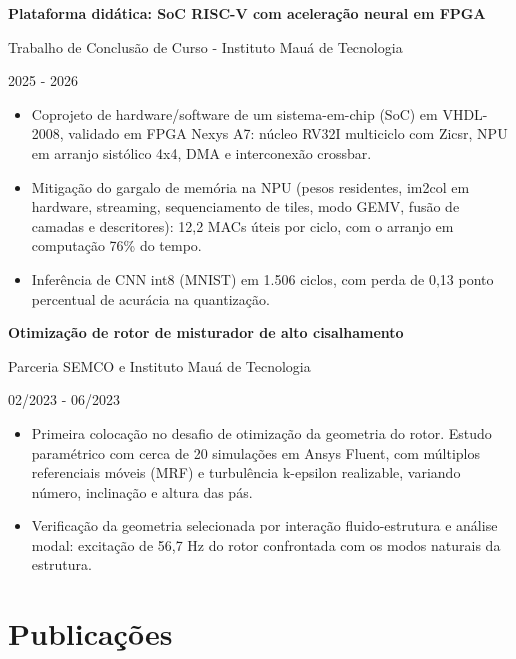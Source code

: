 \documentclass[10pt,a4paper]{article}
\newcommand{\entrada}[3]{%
  \textbf{#1}\par
  #2\par
  #3\par
  \vspace{2pt}}
\newcommand{\espaco}{\vspace{7pt}}
\begin{document}
\espaco
\entrada{Plataforma didática: SoC RISC-V com aceleração neural em FPGA}
        {Trabalho de Conclusão de Curso - Instituto Mauá de Tecnologia}
        {2025 - 2026}
\begin{itemize}
  \item Coprojeto de hardware/software de um sistema-em-chip (SoC) em
        VHDL-2008, validado em FPGA Nexys A7: núcleo RV32I multiciclo com
        Zicsr, NPU em arranjo sistólico 4x4, DMA e interconexão crossbar.
  \item Mitigação do gargalo de memória na NPU (pesos residentes, im2col em
        hardware, streaming, sequenciamento de tiles, modo GEMV, fusão de
        camadas e descritores): 12,2 MACs úteis por ciclo, com o arranjo em
        computação 76\% do tempo.
  \item Inferência de CNN int8 (MNIST) em 1.506 ciclos, com perda de 0,13 ponto
        percentual de acurácia na quantização.
\end{itemize}

\espaco
\entrada{Otimização de rotor de misturador de alto cisalhamento}
        {Parceria SEMCO e Instituto Mauá de Tecnologia}
        {02/2023 - 06/2023}
\begin{itemize}
  \item Primeira colocação no desafio de otimização da geometria do rotor.
        Estudo paramétrico com cerca de 20 simulações em Ansys Fluent, com
        múltiplos referenciais móveis (MRF) e turbulência k-epsilon realizable,
        variando número, inclinação e altura das pás.
  \item Verificação da geometria selecionada por interação fluido-estrutura e
        análise modal: excitação de 56,7 Hz do rotor confrontada com os modos
        naturais da estrutura.
\end{itemize}

\section{Publicações}
\end{document}

